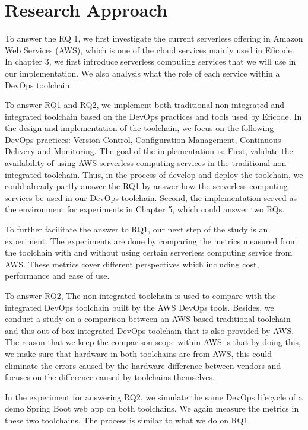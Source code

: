 \section{Research Approach} 
\par
To answer the RQ 1, we first investigate the current serverless offering in Amazon Web Services (AWS), which is one of the cloud services mainly used in Eficode. In chapter 3, we first introduce serverless computing services that we will use in our implementation. We also analysis what the role of each service within a DevOps toolchain.
\par
To answer RQ1 and RQ2, we implement both traditional non-integrated and integrated toolchain based on the DevOps practices and tools used by Eficode. In the design and implementation of the toolchain, we focus on the following DevOps practices: Version Control, Configuration Management, Continuous Delivery and Monitoring. The goal of the implementation is: First, validate the availability of using AWS serverless computing services in the traditional non-integrated toolchain. Thus, in the process of develop and deploy the toolchain, we could already partly answer the RQ1 by answer how the serverless computing services be used in our DevOps toolchain. Second, the implementation served as the environment for experiments in Chapter 5, which could answer two RQs.
\par
To further facilitate the answer to RQ1, our next step of the study is an experiment.
The experiments are done by comparing the metrics measured from the toolchain with and without using certain serverless computing service from AWS. These metrics cover different perspectives which including cost, performance and ease of use. 
\par
To answer RQ2, The non-integrated toolchain is used to compare with the integrated DevOps toolchain built by the AWS DevOps tools.
Besides, we conduct a study on a comparison between an AWS based traditional toolchain and this out-of-box integrated DevOps toolchain that is also provided by AWS. The reason that we keep the comparison scope within AWS is that by doing this, we make sure that hardware in both toolchains are from AWS, this could eliminate the errors caused by the hardware difference between vendors and focuses on the difference caused by toolchains themselves.
\par
In the experiment for answering RQ2, we simulate the same DevOps lifecycle of a demo Spring Boot web app on both toolchains. We again measure the metrics in these two toolchains. The process is similar to what we do on RQ1.
